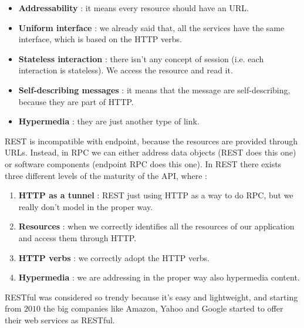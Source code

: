\documentclass[11pt]{article}
\begin{document}
\begin{itemize}
\item \textbf{Addressability} : it means every resource should have an URL.
\item \textbf{Uniform interface} : we already said that, all the services have the same interface, which is based on the HTTP verbs.
\item \textbf{Stateless interaction} : there isn't any concept of session (i.e. each interaction is stateless). We access the resource and read it. 
\item \textbf{Self-describing messages} : it means that the message are self-describing, because they are part of HTTP.
\item \textbf{Hypermedia} : they are just another type of link.
\end{itemize}
REST is incompatible with endpoint, because the resources are provided through URLs. Instead, in RPC we can either address data objects (REST does this one) or software components (endpoint RPC does this one). In REST there exists three different levels of the maturity of the API, where :
\begin{enumerate}
\item \textbf{HTTP as a tunnel} : REST just using HTTP as a way to do RPC, but we really don't model in the proper way.
\item \textbf{Resources} : when we correctly identifies all the resources of our application and access them through HTTP.
\item \textbf{HTTP verbs} : we correctly adopt the HTTP verbs.
\item \textbf{Hypermedia} : we are addressing in the proper way also hypermedia content.
\end{enumerate}
RESTful was considered so trendy because it's easy and lightweight, and starting from $2010$ the big companies like Amazon, Yahoo and Google started to offer their web services as RESTful.
\end{document}
